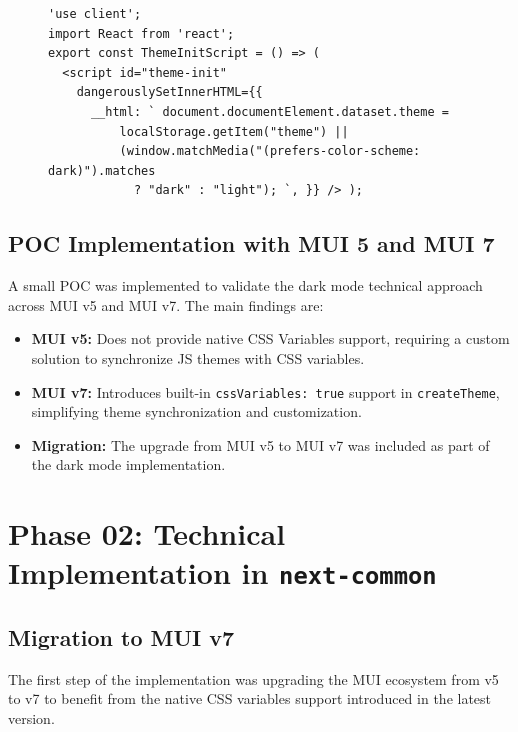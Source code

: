 \begin{figure}[h]
\centering
\begin{lstlisting}[caption={ThemeInitScript.tsx}]
'use client';
import React from 'react';
export const ThemeInitScript = () => (
  <script id="theme-init"
    dangerouslySetInnerHTML={{
      __html: ` document.documentElement.dataset.theme =
          localStorage.getItem("theme") ||
          (window.matchMedia("(prefers-color-scheme: dark)").matches
            ? "dark" : "light"); `, }} /> );
\end{lstlisting}
\label{fig:theme-init-script}
\end{figure}

\subsection{POC Implementation with MUI 5 and MUI 7}

A small POC was implemented to validate the dark mode technical approach across MUI v5 and MUI v7. The main findings are:

\begin{itemize}
    \item \textbf{MUI v5:} Does not provide native CSS Variables support, requiring a custom solution to synchronize \ac{JS} themes with \acs{CSS} variables.
    
    \item \textbf{MUI v7:} Introduces built-in \texttt{cssVariables: true} support in \texttt{createTheme}, simplifying theme synchronization and customization.
    
    \item \textbf{Migration:} The upgrade from MUI v5 to MUI v7 was included as part of the dark mode implementation.
\end{itemize}

\section{Phase 02: Technical Implementation in \texttt{next-common}}

\subsection{Migration to MUI v7}

The first step of the implementation was upgrading the MUI ecosystem from v5 to v7 to benefit from the native CSS variables support introduced in the latest version.

